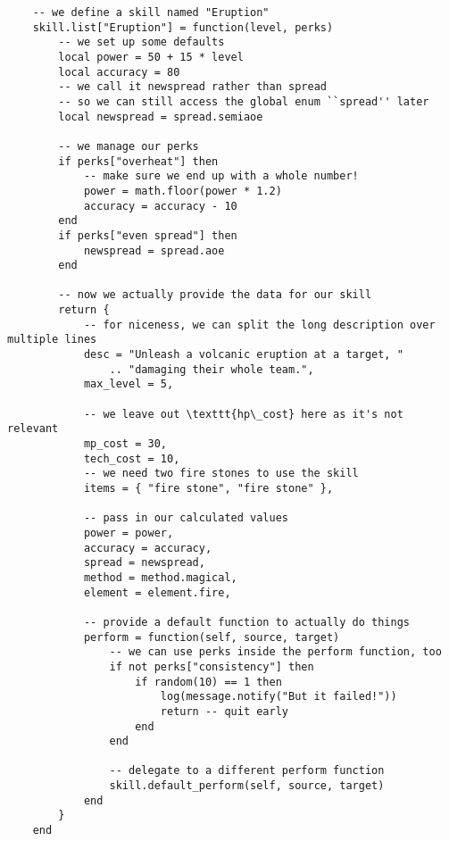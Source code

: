 \begin{lstlisting}
    -- we define a skill named "Eruption"
    skill.list["Eruption"] = function(level, perks)
        -- we set up some defaults
        local power = 50 + 15 * level
        local accuracy = 80
        -- we call it newspread rather than spread
        -- so we can still access the global enum ``spread'' later
        local newspread = spread.semiaoe

        -- we manage our perks
        if perks["overheat"] then
            -- make sure we end up with a whole number!
            power = math.floor(power * 1.2)
            accuracy = accuracy - 10
        end
        if perks["even spread"] then
            newspread = spread.aoe
        end

        -- now we actually provide the data for our skill
        return {
            -- for niceness, we can split the long description over multiple lines
            desc = "Unleash a volcanic eruption at a target, "
                .. "damaging their whole team.",
            max_level = 5,

            -- we leave out \texttt{hp\_cost} here as it's not relevant
            mp_cost = 30,
            tech_cost = 10,
            -- we need two fire stones to use the skill
            items = { "fire stone", "fire stone" },

            -- pass in our calculated values
            power = power,
            accuracy = accuracy,
            spread = newspread,
            method = method.magical,
            element = element.fire,

            -- provide a default function to actually do things
            perform = function(self, source, target)
                -- we can use perks inside the perform function, too
                if not perks["consistency"] then
                    if random(10) == 1 then
                        log(message.notify("But it failed!"))
                        return -- quit early
                    end
                end

                -- delegate to a different perform function
                skill.default_perform(self, source, target)
            end
        }
    end
\end{lstlisting}
